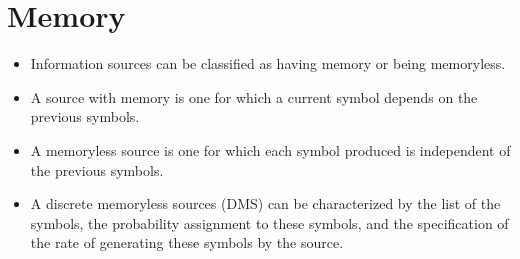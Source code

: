 
\section{Memory}
\begin{itemize} \item Information sources can be classified as having memory or being memoryless.
\item A source with
memory is one for which a current symbol depends on the previous symbols.\item A memoryless source is
one for which each symbol produced is independent of the previous symbols.

\item A discrete memoryless sources (DMS) can be characterized by the list of the symbols, the
probability assignment to these symbols, and the specification of the rate of generating these symbols by the source.\end{itemize}



